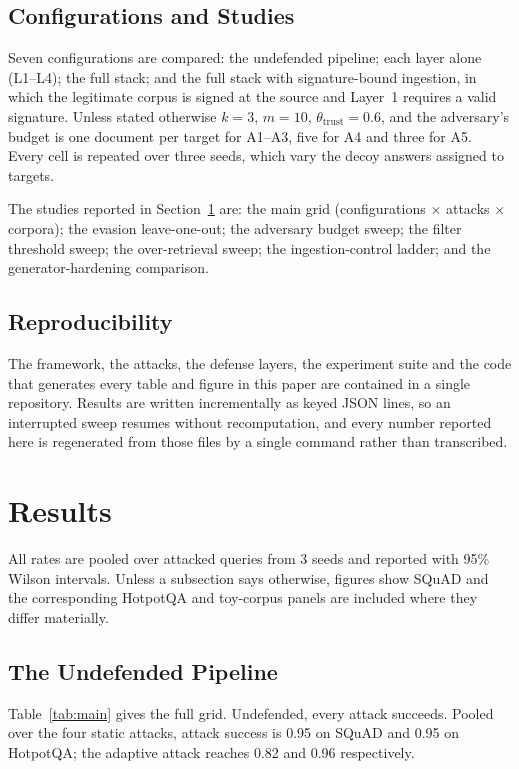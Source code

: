 \documentclass[information,article,submit,moreauthors]{Definitions/mdpi}
\newcommand{\asrStaticHotpotqanone}{0.95}
\newcommand{\asrAdaptiveHotpotqanone}{0.96}
\newcommand{\asrStaticSquadnone}{0.95}
\newcommand{\asrAdaptiveSquadnone}{0.82}
\newcommand{\nSeeds}{3}
\begin{document}
\subsection{Configurations and Studies}

Seven configurations are compared: the undefended pipeline; each layer alone (L1--L4); the full
stack; and the full stack with signature-bound ingestion, in which the legitimate corpus is
signed at the source and Layer~1 requires a valid signature. Unless stated otherwise $k = 3$,
$m = 10$, $\theta_{\mathrm{trust}} = 0.6$, and the adversary's budget is one document per
target for A1--A3, five for A4 and three for A5. Every cell is repeated over three seeds, which
vary the decoy answers assigned to targets.

The studies reported in Section~\ref{sec:results} are: the main grid (configurations $\times$ attacks $\times$ corpora); the
evasion leave-one-out; the adversary budget sweep; the filter threshold sweep; the
over-retrieval sweep; the ingestion-control ladder; and the generator-hardening comparison.

\subsection{Reproducibility}

The framework, the attacks, the defense layers, the experiment suite and the code that
generates every table and figure in this paper are contained in a single repository. Results
are written incrementally as keyed JSON lines, so an interrupted sweep resumes without
recomputation, and every number reported here is regenerated from those files by a single
command rather than transcribed.

\section{Results}
\label{sec:results}

All rates are pooled over attacked queries from \nSeeds{} seeds and reported with 95\% Wilson
intervals. Unless a subsection says otherwise, figures show SQuAD and the corresponding
HotpotQA and toy-corpus panels are included where they differ materially.

\subsection{The Undefended Pipeline}

Table~\ref{tab:main} gives the full grid. Undefended, every attack succeeds. Pooled over the
four static attacks, attack success is \asrStaticSquadnone{} on SQuAD and
\asrStaticHotpotqanone{} on HotpotQA; the adaptive attack reaches \asrAdaptiveSquadnone{} and
\asrAdaptiveHotpotqanone{} respectively.
\end{document}
